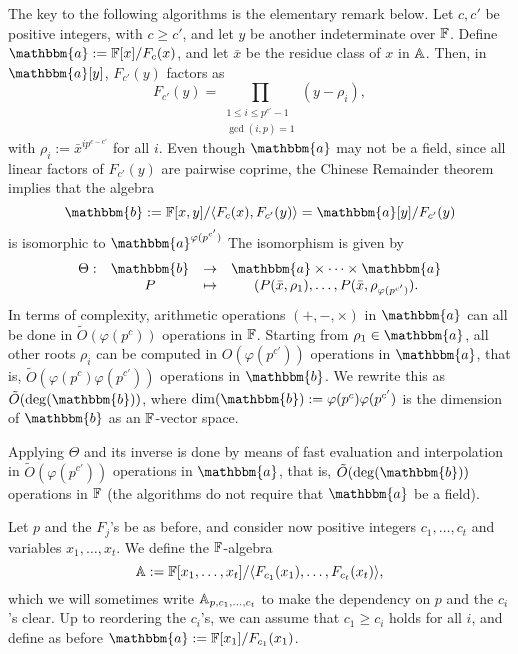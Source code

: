 The key to the following algorithms is the elementary remark below.
Let $c,c'$ be positive integers, with $c \ge c'$, and let $y$ be
another indeterminate over $\mathbb{F}$. Define $\mathbbm{a}:=\F[x]/F_c(x)$,
and let $\bar x$ be the residue class of $x$ in $\mathbb{A}$. Then, in
$\mathbbm{a}[y]$, $F_{c'}(y)$ factors as
$$F_{c'}(y) =\prod_{\substack{1 \le i\le p^{c'}-1\\ \gcd(i,p) =1}}
(y-\rho_i),$$ with $\rho_i:={\bar x}^{i p^{c-c'}}$ for all $i$.  Even
though $\mathbbm{a}$ may not be a field, since all linear factors of
$F_{c'}(y)$ are pairwise coprime, the Chinese Remainder theorem
implies that the algebra
$$\mathbbm{b}:=\F[x,y]/\langle F_c(x), F_{c'}(y)\rangle = \mathbbm{a}[y]/F_{c'}(y)$$
is isomorphic to $\mathbbm{a}^{\varphi(p^{c'})}$
The isomorphism is given by
$$\begin{array}{cccc}
\Theta: & \mathbbm{b} & \to & \mathbbm{a} \times \cdots \times \mathbbm{a} \\
        & P & \mapsto& (P(\bar x,\rho_1),\dots,P(\bar x,\rho_{\varphi(p^{c'})}).
\end{array}$$
In terms of complexity, arithmetic operations $(+,-,\times)$ in $\mathbbm{a}$
can all be done in $\tilde{O}(\varphi(p^c))$ operations in $\mathbb{F}$.
Starting from $\rho_1 \in \mathbbm{a}$, all other roots $\rho_i$ can be
computed in $O(\varphi(p^{c'}))$ operations in $\mathbbm{a}$, that is,
$\tilde{O}(\varphi(p^c) \varphi(p^{c'}))$ operations in $\mathbbm{b}$.  We
rewrite this as $\tilde{O}(\deg(\mathbbm{b}))$, where $\dim(\mathbbm{b}):=\varphi(p^c)
\varphi(p^{c'})$ is the dimension of $\mathbbm{b}$ as an $\mathbb{F}$-vector space.

Applying $\Theta$ and its inverse is done by means of fast evaluation
and interpolation~\cite[Chapter~11]{vzGathen13} in $\tilde{O}(\varphi(p^{c'}))$
operations in $\mathbbm{a}$, that is, $\tilde{O}(\deg(\mathbbm{b}))$ operations in $\mathbb{F}$
(the algorithms do not require that $\mathbbm{a}$ be a field).


\smallskip{}
Let $p$ and the $F_j$'s be as before, and consider now positive integers
$c_1,\dots,c_t$ and variables $x_1,\dots,x_t$. We define the
$\mathbb{F}$-algebra
$$\mathbb{A}:=\mathbb{F}[x_1,\dots,x_t]/\langle F_{c_1}(x_1), \dots,
F_{c_t}(x_t)\rangle,$$ which we will sometimes write
$\mathbb{A}_{p,c_1,\dots,c_t}$ to make the dependency on $p$ and the $c_i$'s
clear. Up to reordering the $c_i$'s, we can assume that $c_1 \ge c_i$
holds for all $i$, and define as before
$\mathbbm{a}:=\F[x_1]/F_{c_1}(x_1)$.

